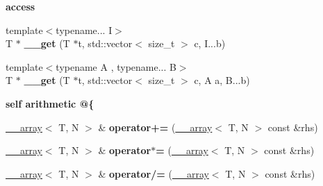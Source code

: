 \begin{Indent}{\bf access}
\begin{DoxyCompactItemize}
\item 
\hypertarget{class____array_a8da2e8a8bd0f3edc94deb82640e9ca02}{
{\footnotesize template$<$typename... I$>$ }\\T $\ast$ {\bfseries \_\-\_\-get} (T $\ast$t, std::vector$<$ size\_\-t $>$ c, I...b)}
\label{class____array_a8da2e8a8bd0f3edc94deb82640e9ca02}

\item 
\hypertarget{class____array_ad0c867ee0e34df488ee66f8e889b942a}{
{\footnotesize template$<$typename A , typename... B$>$ }\\T $\ast$ {\bfseries \_\-\_\-get} (T $\ast$t, std::vector$<$ size\_\-t $>$ c, A a, B...b)}
\label{class____array_ad0c867ee0e34df488ee66f8e889b942a}

\end{DoxyCompactItemize}
\end{Indent}
\begin{Indent}{\bf self arithmetic @\{}\par
{\em \label{_amgrpee29a0132b6b71a7962958404c3728ec}
 }\begin{DoxyCompactItemize}
\item 
\hypertarget{class____array_a1fdacdb2b2a79effe9a11121648a3f44}{
\hyperlink{class____array}{\_\-\_\-array}$<$ T, N $>$ \& {\bfseries operator+=} (\hyperlink{class____array}{\_\-\_\-array}$<$ T, N $>$ const \&rhs)}
\label{class____array_a1fdacdb2b2a79effe9a11121648a3f44}

\item 
\hypertarget{class____array_a5b698b219ec8e62bab83528564caa579}{
\hyperlink{class____array}{\_\-\_\-array}$<$ T, N $>$ \& {\bfseries operator$\ast$=} (\hyperlink{class____array}{\_\-\_\-array}$<$ T, N $>$ const \&rhs)}
\label{class____array_a5b698b219ec8e62bab83528564caa579}

\item 
\hypertarget{class____array_af812f20cd83b4f54cb4b0e780ed07b11}{
\hyperlink{class____array}{\_\-\_\-array}$<$ T, N $>$ \& {\bfseries operator/=} (\hyperlink{class____array}{\_\-\_\-array}$<$ T, N $>$ const \&rhs)}
\label{class____array_af812f20cd83b4f54cb4b0e780ed07b11}

\end{DoxyCompactItemize}
\end{Indent}
